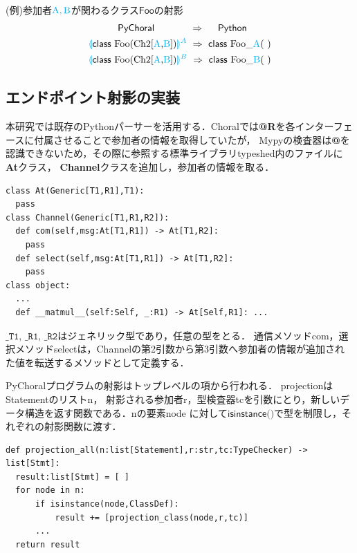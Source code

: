 \documentclass{resume}
\newcommand{\projection}[2]{{\color{cyan}\llparenthesis}#1{\color{cyan}\rrparenthesis^#2}}
\newcommand{\mblue}[1]{\textbf{\textsf{\color{MidnightBlue}#1}}}
\newcommand{\cyan}[1]{\color{cyan}#1}
\begin{document}
%
(例)参加者$\cyan{\text{A}},\cyan{\text{B}}$が関わるクラス$\textsf{Foo}$の射影
\begin{alignat*}{2} 
  &~~~~~~~~~\textsf{PyChoral} ~~~~~~~~~~~\Rightarrow~~~~ \textsf{Python}\\
  &\projection{\textsf{class} ~\text{Foo} \text{(Ch2[{\cyan{A}},{\cyan{B}}])}}{A} ~\Rightarrow~ \textsf{class} ~\text{Foo\_{\cyan{A}}}(~)\\
  &\projection{\textsf{class} ~\text{Foo} \text{(Ch2[{\cyan{A}},{\cyan{B}}])}}{B} ~\Rightarrow~ \textsf{class} ~\text{Foo\_{\cyan{B}}}(~)\\
\end{alignat*}
\vspace*{-20pt}
\subsection{エンドポイント射影の実装}
本研究では既存のPythonパーサーを活用する．Choralでは\mblue{@R}を各インターフェースに付属させることで参加者の情報を取得していたが，
Mypyの検査器は\mblue{@}を認識できないため，その際に参照する標準ライブラリ\textsf{typeshed}内のファイルに\textbf{At}クラス，
\textbf{Channel}クラスを追加し，参加者の情報を取る．
\begin{lstlisting}
class At(Generic[T1,R1],T1):
  pass
class Channel(Generic[T1,R1,R2]):
  def com(self,msg:At[T1,R1]) -> At[T1,R2]:
    pass
  def select(self,msg:At[T1,R1]) -> At[T1,R2]:
    pass
class object:
  ... 
  def __matmul__(self:Self, _:R1) -> At[Self,R1]: ...
\end{lstlisting}
$\texttt{\_T1, \_R1, \_R2}$はジェネリック型であり，任意の型をとる．
通信メソッド\textsf{com}，選択メソッド\textsf{select}は，Channelの第2引数から第3引数へ参加者の情報が追加された値を転送するメソッドとして定義する．

PyChoralプログラムの射影はトップレベルの項から行われる．
\textsf{projection}はStatementのリスト\textsf{n}，
射影される参加者\textsf{r}，型検査器\textsf{tc}を引数にとり，新しいデータ構造を返す関数である．\textsf{n}の要素\textsf{node}
に対して$\textsf{isinstance()}$で型を制限し，それぞれの射影関数に渡す．
\begin{lstlisting}[caption=projection.py,label=data]
def projection_all(n:list[Statement],r:str,tc:TypeChecker) -> list[Stmt]:
  result:list[Stmt] = [ ]
  for node in n:
      if isinstance(node,ClassDef):
          result += [projection_class(node,r,tc)]
      ...
  return result
\end{lstlisting}
\end{document}
